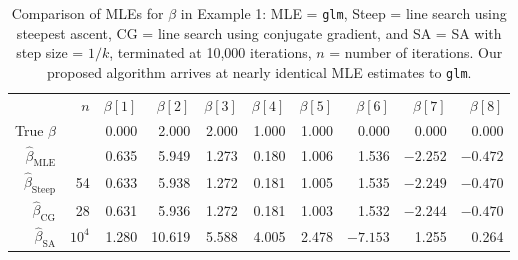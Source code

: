 \begin{table}[h!]
\caption[Comparison of MLEs for $\beta$ in logistic regression example]{Comparison of MLEs for $\beta$ in Example 1: MLE = \texttt{glm}, Steep = line 
search using steepest ascent, 
CG = line search using conjugate gradient, and SA =  SA with step size = $1/k$, 
terminated at 10,000 iterations,
$n$ = number of iterations.  Our 
proposed algorithm arrives at nearly identical MLE estimates to \texttt{glm}.}
\begin{center}
\begin{tabular}{rrrrrrrrrr}
  \hline
 & $n$ & $\beta[1]$ & $\beta[2]$ & $\beta[3]$ & $\beta[4]$ & $\beta[5]$ & $\beta[6]$ & 
$\beta[7]$ & $\beta[8]$ \\ 
True $\beta$ & & 0.000 & 2.000 & 2.000 & 1.000 & 1.000 & 0.000 & 0.000 & 0.000 \\ 
  $\hat{\beta}_{\textrm{MLE}}$ & & 0.635 & 5.949 & 1.273 & 0.180 & 1.006 & 1.536 & 
$-2.252$ & $-0.472$ \\ 
  $\hat{\beta}_{\textrm{Steep}}$ & 54 & 0.633 & 5.938 & 1.272 & 0.181 & 1.005 & 1.535 
& $-2.249$ & $-0.470$ \\ 
  $\hat{\beta}_{\textrm{CG}}$ & 28 & 0.631 & 5.936 & 1.272 & 0.181 & 1.003 & 1.532 & 
$-2.244$ & $-0.470$ \\    
  $\hat{\beta}_{\textrm{SA}}$ & $10^4$ & 1.280 & 10.619 & 5.588 & 4.005 & 2.478 & 
$-7.153$ & 1.255 & 0.264 \\ 
  \hline
\end{tabular}
\end{center}
\label{Table:Logistic}
\end{table}

